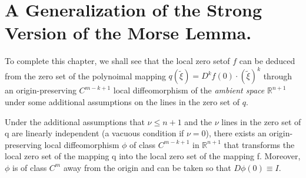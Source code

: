 \section[A Generalization of the Strong Version.....]{A Generalization of the Strong Version of the Morse
  Lemma.}\label{chap2-sec5} 

To complete this chapter, we shall see that the local zero
set\pageoriginale of $f$ can be deduced from the zero set of the
polynoimal mapping $q(\widetilde{\xi}) = D^{k}f(0) \cdot
(\widetilde{\xi})^{k}$ through an origin-preserving $C^{m-k+1}$ local
diffeomorphism of the {\em ambient space} $\mathbb{R}^{n+1}$ under
some additional assumptions on the lines in the zero set of $q$.

\begin{theorem}\label{chap2-thm5.1}
Under the additional assumptions that $\nu \leq n + 1$ and the $\nu$
lines in the zero set of q are linearly independent (a vacuous
condition if $\nu = 0$), there exists an origin-preserving local
diffeomorphism $\phi$ of class $C^{m-k+1}$ in $\mathbb{R}^{n+1}$ that
transforms the local zero set of the mapping q into the local zero set
of the mapping f. Moreover, $\phi$ is of class $C^{m}$ away from the
origin and can be taken so that $D\phi(0) \equiv I$.
\end{theorem}

